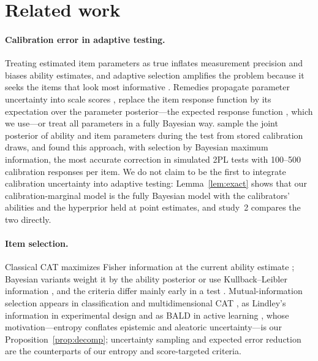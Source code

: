 \section{Related work}
\label{sec:related}

\paragraph{Calibration error in adaptive testing.} Treating estimated item parameters as
true inflates measurement precision and biases ability estimates, and adaptive selection
amplifies the problem because it seeks the items that look most informative
\citep{vanderlinden2000capitalization,olea2012capitalization,patton2013influence}. Remedies
propagate parameter uncertainty into scale scores \citep{zhang2011investigating,yang2012characterizing},
replace the item response function by its expectation over the parameter posterior---the
expected response function \citep{mislevy1994erf}, which we use---or treat all parameters in
a fully Bayesian way. \citet{vanderlinden2020fast} sample the joint posterior of ability and
item parameters during the test from stored calibration draws, and \citet{fink2025accounting}
found this approach, with selection by Bayesian maximum information, the most accurate
correction in simulated 2PL tests with 100--500 calibration responses per item. We do not
claim to be the first to integrate calibration uncertainty into adaptive testing:
Lemma~\ref{lem:exact} shows that our calibration-marginal model is the fully Bayesian model
with the calibrators' abilities and the hyperprior held at point estimates, and study~2
compares the two directly.

\paragraph{Item selection.} Classical CAT maximizes Fisher information at the current
ability estimate \citep{lord1980applications}; Bayesian variants weight it by the ability
posterior or use Kullback--Leibler information
\citep{owen1975bayesian,vanderlinden1998bayesian,chang1996global,veerkamp1997some}, and the
criteria differ mainly early in a test \citep{chen2000comparison}. Mutual-information
selection appears in classification and multidimensional CAT
\citep{weissman2007mutual,wang2011item}, as Lindley's information in experimental design
\citep{lindley1956measure,chaloner1995bayesian,rainforth2024modern} and as BALD in active
learning \citep{houlsby2011bald}, whose motivation---entropy conflates epistemic and
aleatoric uncertainty---is our Proposition~\ref{prop:decomp}; uncertainty sampling
\citep{lewis1994sequential} and expected error reduction \citep{roy2001toward} are the
counterparts of our entropy and score-targeted criteria.

